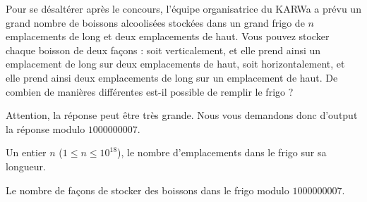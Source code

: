 \problemname{\problemyamlname}


Pour se désaltérer après le concours, l'équipe organisatrice du KARWa a prévu un grand
nombre de boissons alcoolisées stockées dans un grand frigo de $n$ emplacements
de long et deux emplacements de haut. Vous pouvez stocker chaque boisson de
deux façons : soit verticalement, et elle prend ainsi un emplacement de long sur
deux emplacements de haut, soit horizontalement, et elle prend ainsi deux
emplacements de long sur un emplacement de haut. De combien de manières
différentes est-il possible de remplir le frigo ?

Attention, la réponse peut être très grande. Nous vous demandons donc d'output
la réponse modulo $1000000007$.

\begin{Input}
	Un entier $n$ ($1 \le n \le 10^{18}$), le nombre d'emplacements dans le frigo sur sa longueur.
\end{Input}

\begin{Output}
	Le nombre de façons de stocker des boissons dans le frigo modulo $1000000007$.
\end{Output}
